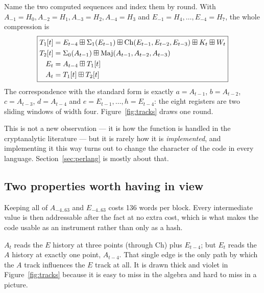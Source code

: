 \documentclass[11pt,a4paper]{article}
\begin{document}
Name the two computed sequences and index them by round. With
$A_{-1}\!=\!H_0, A_{-2}\!=\!H_1, A_{-3}\!=\!H_2, A_{-4}\!=\!H_3$ and
$E_{-1}\!=\!H_4, \ldots, E_{-4}\!=\!H_7$, the whole compression is
%
\begin{equation}\label{eq:2d}
\fbox{$\displaystyle
\begin{aligned}
T_1[t] &= E_{t-4} \boxplus \Sigma_1(E_{t-1}) \boxplus \mathrm{Ch}(E_{t-1},E_{t-2},E_{t-3}) \boxplus K_t \boxplus W_t \\
T_2[t] &= \Sigma_0(A_{t-1}) \boxplus \mathrm{Maj}(A_{t-1},A_{t-2},A_{t-3}) \\
E_t    &= A_{t-4} \boxplus T_1[t] \\
A_t    &= T_1[t] \boxplus T_2[t]
\end{aligned}$}
\end{equation}
%
The correspondence with the standard form is exactly
$a = A_{t-1}$, $b = A_{t-2}$, $c = A_{t-3}$, $d = A_{t-4}$ and
$e = E_{t-1}, \ldots, h = E_{t-4}$: the eight registers are two sliding
windows of width four. Figure~\ref{fig:tracks} draws one round.

This is not a new observation --- it is how the function is handled in the
cryptanalytic literature --- but it is rarely how it is \emph{implemented}, and
implementing it this way turns out to change the character of the code in every
language. Section~\ref{sec:perlang} is mostly about that.

\subsection*{Two properties worth having in view}

\begin{description}[leftmargin=1.4em,style=nextline]
\item[The state \emph{is} the history.] Keeping all of $A_{-4..63}$ and
  $E_{-4..63}$ costs 136 words per block. Every intermediate value is then
  addressable after the fact at no extra cost, which is what makes the code
  usable as an instrument rather than only as a hash.
\item[The tracks are not symmetric.] $A_t$ reads the $E$ history at three
  points (through $\mathrm{Ch}$) plus $E_{t-4}$; but $E_t$ reads the $A$
  history at exactly one point, $A_{t-4}$. That single edge is the only path
  by which the $A$ track influences the $E$ track at all. It is drawn thick and
  violet in Figure~\ref{fig:tracks} because it is easy to miss in the algebra
  and hard to miss in a picture.
\end{description}
\end{document}
